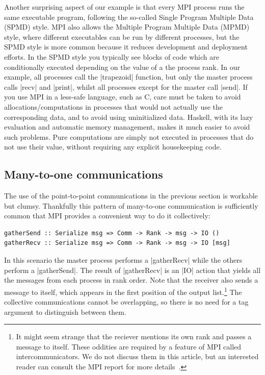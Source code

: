 \documentclass{tmr}
\begin{document}
Another surprising aspect of our example is that every MPI process
runs the same executable program, following the so-called
Single Program Multiple Data (SPMD) style. MPI also allows
the Multiple Program Multiple Data (MPMD) style, where
different executables can be run by different processes, but the SPMD
style is more common because it reduces development and deployment efforts.
In the SPMD style you typically see blocks of code which are
conditionally executed depending on the value of a the process rank.
In our example, all processes call the |trapezoid| function, but
only the master process calls |recv| and |print|, whilst
all processes except for the master call |send|.
If you use MPI in a less-safe language, such as C, care must
be taken to avoid allocations/computations in processes that would not
actually use the corresponding data, and to avoid using
uninitialized data. Haskell, with its lazy evaluation and automatic
memory management, makes it much easier to avoid such problems.
Pure computations are simply not executed in processes that do not use their
value, without requiring any explicit housekeeping code.

\subsection{Many-to-one communications}

The use of the point-to-point communications in the previous section
is workable but clumsy. Thankfully this pattern of many-to-one
communication is sufficiently common that MPI provides a
convenient way to do it collectively:
\begin{Verbatim}
gatherSend :: Serialize msg => Comm -> Rank -> msg -> IO ()
gatherRecv :: Serialize msg => Comm -> Rank -> msg -> IO [msg]
\end{Verbatim}
In this scenario the master process performs a
|gatherRecv| while the others perform a |gatherSend|.
The result of |gatherRecv| is an |IO| action that yields all
the messages from each process in rank order. Note that
the receiver also sends a message to itself, which appears in
the first position of the output list.\footnote{It might seem
strange that the reciever mentions its own rank and passes a message to itself.
These oddities are required by a feature of
MPI called intercommunicators. We do not discuss them in this
article, but an interested reader can consult the MPI report
for more details~\cite{mpi-report}.} The collective communications
cannot be overlapping, so there is no need for a tag argument to
distinguish between them.
\end{document}
